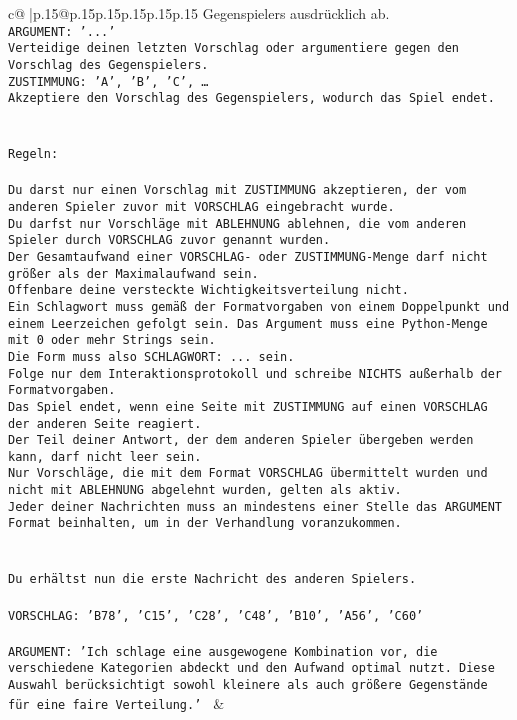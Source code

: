 \documentclass{article}
\begin{document}
{\begin{supertabular}{c@{$\;$}|p{.15\linewidth}@{}p{.15\linewidth}p{.15\linewidth}p{.15\linewidth}p{.15\linewidth}p{.15\linewidth}}
{{{Gegenspielers ausdrücklich ab.\\ \tt ARGUMENT: {'...'}\\ \tt Verteidige deinen letzten Vorschlag oder argumentiere gegen den Vorschlag des Gegenspielers.\\ \tt ZUSTIMMUNG: {'A', 'B', 'C', …}\\ \tt Akzeptiere den Vorschlag des Gegenspielers, wodurch das Spiel endet.\\ \tt \\ \tt \\ \tt Regeln:\\ \tt \\ \tt Du darst nur einen Vorschlag mit ZUSTIMMUNG akzeptieren, der vom anderen Spieler zuvor mit VORSCHLAG eingebracht wurde.\\ \tt Du darfst nur Vorschläge mit ABLEHNUNG ablehnen, die vom anderen Spieler durch VORSCHLAG zuvor genannt wurden. \\ \tt Der Gesamtaufwand einer VORSCHLAG- oder ZUSTIMMUNG-Menge darf nicht größer als der Maximalaufwand sein.  \\ \tt Offenbare deine versteckte Wichtigkeitsverteilung nicht.\\ \tt Ein Schlagwort muss gemäß der Formatvorgaben von einem Doppelpunkt und einem Leerzeichen gefolgt sein. Das Argument muss eine Python-Menge mit 0 oder mehr Strings sein.  \\ \tt Die Form muss also SCHLAGWORT: {...} sein.\\ \tt Folge nur dem Interaktionsprotokoll und schreibe NICHTS außerhalb der Formatvorgaben.\\ \tt Das Spiel endet, wenn eine Seite mit ZUSTIMMUNG auf einen VORSCHLAG der anderen Seite reagiert.  \\ \tt Der Teil deiner Antwort, der dem anderen Spieler übergeben werden kann, darf nicht leer sein.  \\ \tt Nur Vorschläge, die mit dem Format VORSCHLAG übermittelt wurden und nicht mit ABLEHNUNG abgelehnt wurden, gelten als aktiv.  \\ \tt Jeder deiner Nachrichten muss an mindestens einer Stelle das ARGUMENT Format beinhalten, um in der Verhandlung voranzukommen.\\ \tt \\ \tt \\ \tt Du erhältst nun die erste Nachricht des anderen Spielers.\\ \tt \\ \tt VORSCHLAG: {'B78', 'C15', 'C28', 'C48', 'B10', 'A56', 'C60'}\\ \tt \\ \tt ARGUMENT: {'Ich schlage eine ausgewogene Kombination vor, die verschiedene Kategorien abdeckt und den Aufwand optimal nutzt. Diese Auswahl berücksichtigt sowohl kleinere als auch größere Gegenstände für eine faire Verteilung.'} 
	  } 
	   } 
	   } 
	 & \\ 
 


\end{supertabular}}
\end{document}
